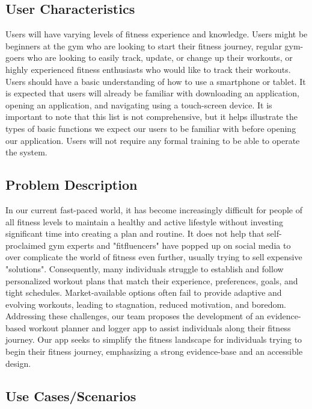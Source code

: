 \documentclass[12pt]{article}
\begin{document}
\subsection{User Characteristics}
Users will have varying levels of fitness experience and knowledge. Users might be beginners at the gym who are looking to start their fitness journey, regular gym-goers who are looking to easily track, update, or change up their workouts, or highly experienced fitness enthusiasts who would like to track their workouts. Users should have a basic understanding of how to use a smartphone or tablet. It is expected that users will already be familiar with downloading an application, opening an application, and navigating using a touch-screen device. It is important to note that this list is not comprehensive, but it helps illustrate the types of basic functions we expect our users to be familiar with before opening our application. Users will not require any formal training to be able to operate the system.

\subsection{Problem Description}

In our current fast-paced world, it has become increasingly difficult for people of all fitness levels to maintain a healthy and active lifestyle without investing significant time into creating a plan and routine. It does not help that self-proclaimed gym experts and "fitfluencers" have popped up on social media to over complicate the world of fitness even further, usually trying to sell expensive "solutions". Consequently, many individuals struggle to establish and follow personalized workout plans that match their experience, preferences, goals, and tight schedules. Market-available options often fail to provide adaptive and evolving workouts, leading to stagnation, reduced motivation, and boredom. Addressing these challenges, our team proposes the development of an evidence-based workout planner and logger app to assist individuals along their fitness journey. Our app seeks to simplify the fitness landscape for individuals trying to begin their fitness journey, emphasizing a strong evidence-base and an accessible design. 

\subsection{Use Cases/Scenarios}
\end{document}
